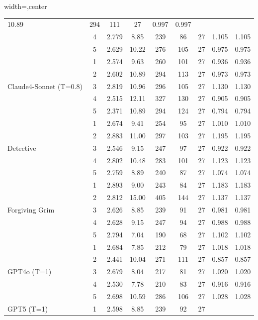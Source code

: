 \begin{table}[htbp]
\begin{adjustbox}{width=\textwidth,center}
\begin{tabular}{|l|c|c|c|c|c|c|c|c|}
10.89 & 
294 & 
111 & 
27 & 
0.997 & 
0.997 \\
 & 
4 & 
2.779 & 
8.85 & 
239 & 
86 & 
27 & 
1.105 & 
1.105 \\
 & 
5 & 
2.629 & 
10.22 & 
276 & 
105 & 
27 & 
0.975 & 
0.975 \\
\hline
\multirow{5}{*}{Claude4-Sonnet (T=0.8)} & 
1 & 
2.574 & 
9.63 & 
260 & 
101 & 
27 & 
0.936 & 
0.936 \\
 & 
2 & 
2.602 & 
10.89 & 
294 & 
113 & 
27 & 
0.973 & 
0.973 \\
 & 
3 & 
2.819 & 
10.96 & 
296 & 
105 & 
27 & 
1.130 & 
1.130 \\
 & 
4 & 
2.515 & 
12.11 & 
327 & 
130 & 
27 & 
0.905 & 
0.905 \\
 & 
5 & 
2.371 & 
10.89 & 
294 & 
124 & 
27 & 
0.794 & 
0.794 \\
\hline
\multirow{5}{*}{Detective} & 
1 & 
2.674 & 
9.41 & 
254 & 
95 & 
27 & 
1.010 & 
1.010 \\
 & 
2 & 
2.883 & 
11.00 & 
297 & 
103 & 
27 & 
1.195 & 
1.195 \\
 & 
3 & 
2.546 & 
9.15 & 
247 & 
97 & 
27 & 
0.922 & 
0.922 \\
 & 
4 & 
2.802 & 
10.48 & 
283 & 
101 & 
27 & 
1.123 & 
1.123 \\
 & 
5 & 
2.759 & 
8.89 & 
240 & 
87 & 
27 & 
1.074 & 
1.074 \\
\hline
\multirow{5}{*}{Forgiving Grim} & 
1 & 
2.893 & 
9.00 & 
243 & 
84 & 
27 & 
1.183 & 
1.183 \\
 & 
2 & 
2.812 & 
15.00 & 
405 & 
144 & 
27 & 
1.137 & 
1.137 \\
 & 
3 & 
2.626 & 
8.85 & 
239 & 
91 & 
27 & 
0.981 & 
0.981 \\
 & 
4 & 
2.628 & 
9.15 & 
247 & 
94 & 
27 & 
0.988 & 
0.988 \\
 & 
5 & 
2.794 & 
7.04 & 
190 & 
68 & 
27 & 
1.102 & 
1.102 \\
\hline
\multirow{5}{*}{GPT4o (T=1)} & 
1 & 
2.684 & 
7.85 & 
212 & 
79 & 
27 & 
1.018 & 
1.018 \\
 & 
2 & 
2.441 & 
10.04 & 
271 & 
111 & 
27 & 
0.857 & 
0.857 \\
 & 
3 & 
2.679 & 
8.04 & 
217 & 
81 & 
27 & 
1.020 & 
1.020 \\
 & 
4 & 
2.530 & 
7.78 & 
210 & 
83 & 
27 & 
0.916 & 
0.916 \\
 & 
5 & 
2.698 & 
10.59 & 
286 & 
106 & 
27 & 
1.028 & 
1.028 \\
\hline
\multirow{5}{*}{GPT5 (T=1)} & 
1 & 
2.598 & 
8.85 & 
239 & 
92 & 
27 & 

\end{tabular}
\end{adjustbox}
\end{table}
